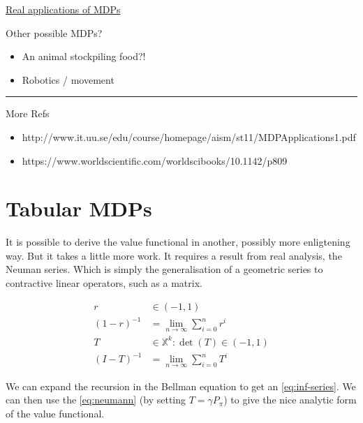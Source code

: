 \href{http://www.it.uu.se/edu/course/homepage/aism/st11/MDPApplications1.pdf}{Real
applications of MDPs}

Other possible MDPs?

\begin{itemize}
\tightlist
\item
  An animal stockpiling food?!
\item
  Robotics / movement
\end{itemize}

\begin{center}\rule{0.5\linewidth}{\linethickness}\end{center}

More Refs

\begin{itemize}
\tightlist
\item
  http://www.it.uu.se/edu/course/homepage/aism/st11/MDPApplications1.pdf
\item
  https://www.worldscientific.com/worldscibooks/10.1142/p809
\end{itemize}

\section{Tabular MDPs}\label{vf-neumann}

It is possible to derive the value functional in another, possibly more enligtening way. But it takes a little more work. It requires a result from real analysis, the Neuman series. Which is simply the generalisation of a geometric series to contractive linear operators, such as a matrix.

\begin{align*}
r &\in (-1, 1) \\
(1-r)^{-1} &= \lim_{n\to \infty} \sum_{i=0}^n r^i \tag{Geometric series}\\
T &\in \mathbb X^k: \det(T) \in (-1, 1) \\
(I-T)^{-1} &= \lim_{n\to \infty} \sum_{i=0}^n T^i \label{eq:neumann}\tag{Neumann series}
\end{align*}

We can expand the recursion in the Bellman equation to get an \eqref{eq:inf-series}. We can then use the \eqref{eq:neumann} (by setting $T=\gamma P_{\pi}$) to give the nice analytic form of the value functional.

